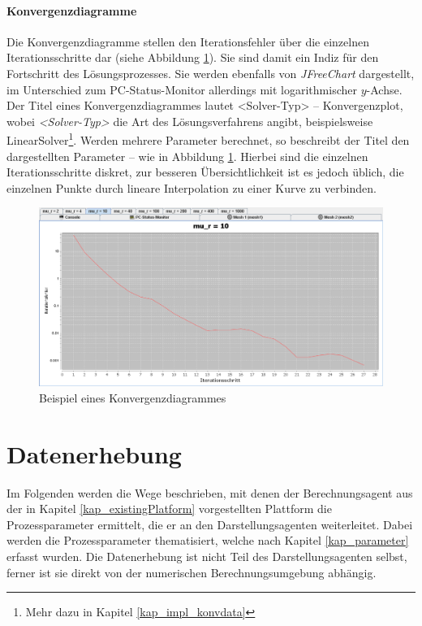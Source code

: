 \documentclass[a4paper,12pt,oneside,openright,onecolumn,final,titlepage,fleqn,ngerman]{scrreprt}
\newcommand{\parag}{\\[2ex]}
\newcommand{\calcag}{Berechnungsagent}
\newcommand{\repag}{Darstellungsagent}
\begin{document}
	\paragraph{Konvergenzdiagramme}
	Die Konvergenzdiagramme stellen den Iterationsfehler über die einzelnen Iterationsschritte dar (siehe Abbildung \ref{ss_konvplot}). Sie sind damit ein Indiz für den Fortschritt des Lösungsprozesses. Sie werden ebenfalls von \emph{JFreeChart} dargestellt, im Unterschied zum PC-Status-Monitor allerdings mit logarithmischer \(y\)-Achse.\parag{}
	Der Titel eines Konvergenzdiagrammes lautet \glqq{}\textless{}Solver-Typ\textgreater{} -- Konvergenzplot\grqq{}, wobei \emph{\textless{}Solver-Typ\textgreater{}} die Art des Lösungsverfahrens angibt, beispielsweise \glqq{}LinearSolver\grqq{}\footnote{Mehr dazu in Kapitel \ref{kap_impl_konvdata}}. Werden mehrere Parameter berechnet, so beschreibt der Titel den dargestellten Parameter -- wie in Abbildung \ref{ss_konvplot}. Hierbei sind die einzelnen Iterationsschritte diskret, zur besseren Übersichtlichkeit ist es jedoch üblich, die einzelnen Punkte durch lineare Interpolation zu einer Kurve zu verbinden.
	\begin{figure}[ht]
		\centering
		\includegraphics[keepaspectratio=true,width=\textwidth]{res/ss_konvplot.png}
		\caption{Beispiel eines Konvergenzdiagrammes}
		\label{ss_konvplot}
	\end{figure}
	
	\section{Datenerhebung}
	Im Folgenden werden die Wege beschrieben, mit denen der \calcag{} aus der in Kapitel \ref{kap_existingPlatform} vorgestellten Plattform die Prozessparameter ermittelt, die er an den \repag{}en weiterleitet. Dabei werden die Prozessparameter thematisiert, welche nach Kapitel \ref{kap_parameter} erfasst wurden. Die Datenerhebung ist nicht Teil des \repag{}en selbst, ferner ist sie direkt von der numerischen Berechnungsumgebung abhängig.
	
\end{document}
